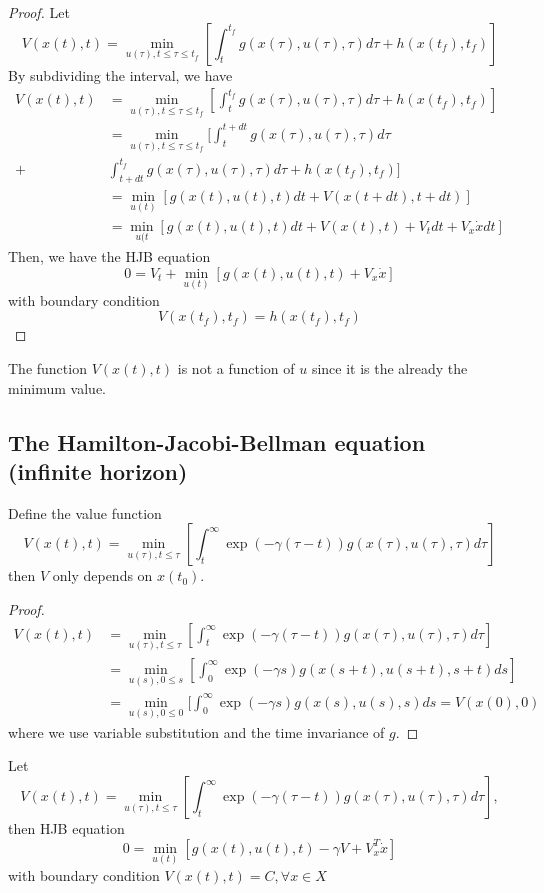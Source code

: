 \begin{refsection}
\begin{proof}
Let $$V(x(t),t)=\min_{u(\tau),t\leq \tau \leq t_f}[ \int_t^{t_f} g(x(\tau),u(\tau),\tau) d\tau + h(x(t_f),t_f) ]$$By subdividing the interval, we have
\begin{align*}
    V(x(t),t) &=\min_{u(\tau),t\leq \tau \leq t_f}[ \int_t^{t_f} g(x(\tau),u(\tau),\tau) d\tau + h(x(t_f),t_f) ]\\
    &= \min_{u(\tau),t\leq \tau \leq t_f}[ \int_t^{t + dt} g(x(\tau),u(\tau),\tau) d\tau \\+  & \int_{t+dt}^{t_f} g(x(\tau),u(\tau),\tau) d\tau + h(x(t_f),t_f) ]\\
    &= \min_{u(t)}[ g(x(t),u(t),t) dt + V(x(t+dt),t+dt)]\\
    & = \min_{u(t}[ g(x(t),u(t),t) dt + V(x(t),t) + V_t dt + V_x \dot{x}dt]
\end{align*}
Then, we have the HJB equation 
$$0 = V_t + \min_{u(t)}[ g(x(t),u(t),t) + V_x\dot{x}] $$
with boundary condition 
$$V(x(t_f),t_f) = h(x(t_f),t_f)$$
\end{proof}

\begin{remark}
The function $V(x(t),t)$ is not a function of $u$ since it is the already the minimum value. 
\end{remark}

\subsection{The Hamilton-Jacobi-Bellman equation (infinite horizon)}
\begin{lemma}
Define the value function $$V(x(t),t)=\min_{u(\tau),t\leq \tau }[ \int_t^{\infty} \exp(-\gamma (\tau-t)) g(x(\tau),u(\tau),\tau) d\tau ]$$
then $V$ only depends on $x(t_0)$.
\end{lemma}
\begin{proof}
\begin{align*}
V(x(t),t)&=\min_{u(\tau),t\leq \tau }[ \int_t^{\infty} \exp(-\gamma (\tau-t))g(x(\tau),u(\tau),\tau) d\tau ]\\
&=\min_{u(s),0\leq s }[ \int_0^{\infty}\exp(-\gamma s) g(x(s+t),u(s+t),s+t) ds ]\\
&=\min_{u(s),0\leq 0 }[ \int_0^{\infty}\exp(-\gamma s) g(x(s),u(s),s) ds = V(x(0),0)
\end{align*}
where we use variable substitution and the time invariance of $g$.	
\end{proof}

\begin{theorem}\label{ch:deterministic-optimal-control-theory:th:HJBinfinitehorizon}
Let $$V(x(t),t)=\min_{u(\tau),t\leq \tau }[ \int_t^{\infty} \exp(-\gamma (\tau-t)) g(x(\tau),u(\tau),\tau) d\tau ],$$	
then HJB equation 
$$0 = \min_{u(t)}[ g(x(t),u(t),t) -\gamma V+ V^T_x \dot{x}] $$
with boundary condition $V(x(t),t) = C, \forall x\in X$
\end{theorem}


\end{refsection}
